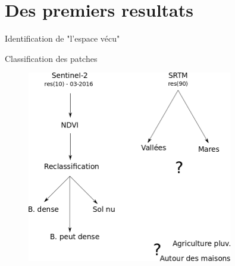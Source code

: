\documentclass[newPxFont]{beamer}
\begin{document}

\section{Des premiers resultats}

\begin{frame}[c]{Identification de "l'espace vécu"}
\vspace{-1cm}
\begin{figure}
\end{figure}
\end{frame}



\begin{frame}[c]{Classification des patches}
\vspace{-1cm}
\begin{figure}
  \centering
  \includegraphics[width = 0.8\textwidth]{img/process}
\end{figure}

\end{frame}
\end{document}
